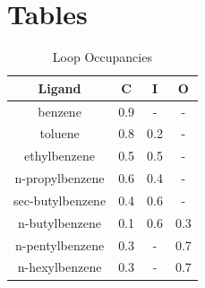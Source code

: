 \documentclass[journal=jctcce,manuscript=article]{achemso}
\begin{document}
\section{Tables}
\begin{table}[!htb]
\centering
\caption{Loop Occupancies \cite{Merski2015}}
\label{tbl:loop-occ}
\begin{tabular}{|c|c|c|c|}
\hline
\textbf{Ligand}                                                 & \textbf{C} & \textbf{I} & \textbf{O} \\ \hline
\cellcolor[HTML]{800080} benzene          & \cellcolor[HTML]{C0C0C0}0.9        & -          & -          \\ \hline
\cellcolor[HTML]{800080} toluene          & \cellcolor[HTML]{C0C0C0}0.8        & 0.2        & -          \\ \hline
\cellcolor[HTML]{800080} ethylbenzene     & \cellcolor[HTML]{C0C0C0}0.5        & 0.5        & -          \\ \hline
\cellcolor[HTML]{800080} n-propylbenzene  & \cellcolor[HTML]{C0C0C0}0.6        & 0.4        & -          \\ \hline
\cellcolor[HTML]{00FFFF} sec-butylbenzene & 0.4        & \cellcolor[HTML]{C0C0C0}0.6        & -          \\ \hline
\cellcolor[HTML]{00FFFF} n-butylbenzene   & 0.1        & \cellcolor[HTML]{C0C0C0}0.6        & 0.3        \\ \hline
\cellcolor[HTML]{008000} n-pentylbenzene  & 0.3        &    -        & \cellcolor[HTML]{C0C0C0}0.7        \\ \hline
\cellcolor[HTML]{008000} n-hexylbenzene   & 0.3        &    -       & \cellcolor[HTML]{C0C0C0}0.7        \\ \hline
\end{tabular}
\end{table}
\end{document}
